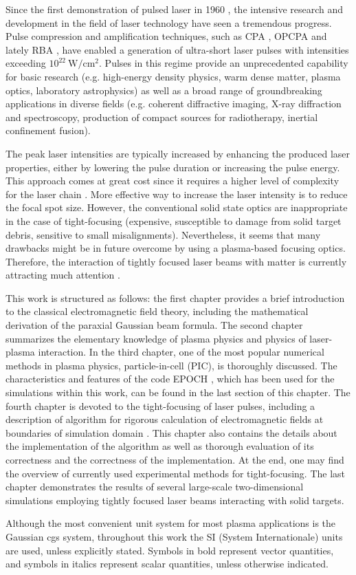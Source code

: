 Since the first demonstration of pulsed laser in 1960 \cite{Maiman1960}, the intensive research and development in the field of laser technology have seen a tremendous progress. Pulse compression and amplification techniques, such as CPA \cite{StricklandMourou1985}, OPCPA \cite{Dubietis1992} and lately RBA \cite{Malkin1999}, have enabled a generation of ultra-short laser pulses with intensities exceeding $ 10^{22} \ \mathrm{W/cm^{2}} $. Pulses in this regime provide an unprecedented capability for basic research (e.g. high-energy density physics, warm dense matter, plasma optics, laboratory astrophysics) as well as a broad range of groundbreaking applications in diverse fields (e.g. coherent diffractive imaging, X-ray diffraction and spectroscopy, production of compact sources for radiotherapy, inertial confinement fusion).

The peak laser intensities are typically increased by enhancing the produced laser properties, either by lowering the pulse duration or increasing the pulse energy. This approach comes at great cost since it requires a higher level of complexity for the laser chain \cite{Fuchs2014}. More effective way to increase the laser intensity is to reduce the focal spot size. However, the conventional solid state optics are inappropriate in the case of tight-focusing (expensive, susceptible to damage from solid target debris, sensitive to small misalignments). Nevertheless, it seems that many drawbacks might be in future overcome by using a plasma-based focusing optics. Therefore, the interaction of tightly focused laser beams with matter is currently attracting much attention \cite{Popov2008, Popov2009, Lifschitz2016}. 

This work is structured as follows: the first chapter provides a brief introduction to the classical electromagnetic field theory, including the mathematical derivation of the paraxial Gaussian beam formula. The second chapter summarizes the elementary knowledge of plasma physics and physics of laser-plasma interaction. In the third chapter, one of the most popular numerical methods in plasma physics, particle-in-cell (PIC), is thoroughly discussed. The characteristics and features of the code EPOCH \cite{bennett}, which has been used for the simulations within this work, can be found in the last section of this chapter. The fourth chapter is devoted to the tight-focusing of laser pulses, including a description of algorithm for rigorous calculation of electromagnetic fields at boundaries of simulation domain \cite{Thiele2016}. This chapter also contains the details about the implementation of the algorithm as well as thorough evaluation of its correctness and the correctness of the implementation. At the end, one may find the overview of currently used experimental methods for tight-focusing. The last chapter demonstrates the results of several large-scale two-dimensional simulations employing tightly focused laser beams interacting with solid targets.

Although the most convenient unit system for most plasma applications is the Gaussian cgs system, throughout this work the SI (System Internationale) units are used, unless explicitly stated. Symbols in bold represent vector quantities, and symbols in italics represent scalar quantities, unless otherwise indicated.

